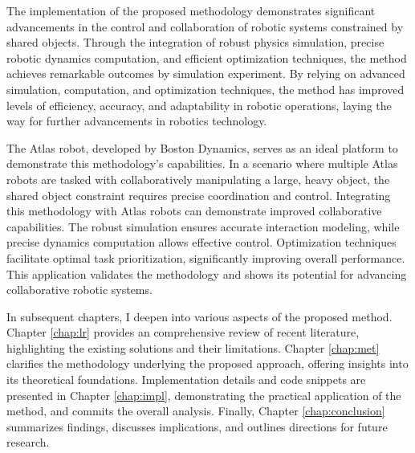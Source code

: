 The implementation of the proposed methodology demonstrates significant 
advancements in the control and collaboration of robotic systems 
constrained by shared objects. Through the integration of robust physics 
simulation, precise robotic dynamics computation, and efficient 
optimization techniques, the method achieves remarkable outcomes by 
simulation experiment. By relying on advanced simulation, computation, 
and optimization techniques, the method has improved levels of efficiency, 
accuracy, and adaptability in robotic operations, laying the way for 
further advancements in robotics technology.

The Atlas robot, developed by Boston Dynamics, serves as an ideal platform 
to demonstrate this methodology's capabilities. In a scenario where 
multiple Atlas robots are tasked with collaboratively manipulating a large, 
heavy object, the shared object constraint requires precise coordination 
and control. Integrating this methodology with Atlas robots can demonstrate improved 
collaborative capabilities. The robust simulation ensures accurate 
interaction modeling, while precise dynamics computation allows effective 
control. Optimization techniques facilitate optimal task prioritization, 
significantly improving overall performance. This application validates 
the methodology and shows its potential for advancing collaborative robotic 
systems.

In subsequent chapters, I deepen into various aspects of the proposed method. 
Chapter \ref{chap:lr} provides an comprehensive review of recent literature, 
highlighting the existing solutions and their limitations. 
Chapter \ref{chap:met} clarifies the methodology underlying the proposed 
approach, offering insights into its theoretical foundations. Implementation 
details and code snippets are presented in Chapter \ref{chap:impl}, 
demonstrating the practical application of the method, and commits the 
overall analysis. Finally, Chapter \ref{chap:conclusion} summarizes findings, 
discusses implications, and outlines directions for future research.
